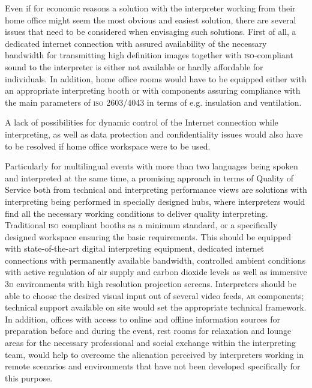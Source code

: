 \documentclass[output=paper]{langsci/langscibook}
\begin{document}
Even if for economic reasons a solution with the interpreter working from their home office might seem the most obvious and easiest solution, there are several issues that need to be considered when envisaging such solutions. First of all, a dedicated internet connection with assured availability of the necessary bandwidth for transmitting high definition images together with \textsc{iso}-compliant sound to the interpreter is either not available or hardly affordable for individuals. In addition, home office rooms would have to be equipped either with an appropriate interpreting booth or with components assuring compliance with the main parameters of \textsc{iso 2603/4043} in terms of e.g. insulation and ventilation.

A lack of possibilities for dynamic control of the Internet connection while interpreting, as well as data protection and confidentiality issues would also have to be resolved if home office workspace were to be used.

Particularly for multilingual events with more than two languages being spoken and interpreted at the same time, a promising approach in terms of Quality of Service both from technical and interpreting performance views are solutions with interpreting being performed in specially designed hubs, where interpreters would find all the necessary working conditions to deliver quality interpreting. Traditional \textsc{iso} compliant booths as a minimum standard, or a specifically designed workspace ensuring the basic requirements. This should be equipped with state-of-the-art digital interpreting equipment, dedicated internet connections with permanently available bandwidth, controlled ambient conditions with active regulation of air supply and carbon dioxide levels as well as immersive \textsc{3d} environments with high resolution projection screens. Interpreters should be able to choose the desired visual input out of several video feeds, \textsc{ar} components; technical support available on site would set the appropriate technical framework. In addition, offices with access to online and offline information sources for preparation before and during the event, rest rooms for relaxation and lounge areas for the necessary professional and social exchange within the interpreting team, would help to overcome the alienation perceived by interpreters working in remote scenarios and environments that have not been developed specifically for this purpose. 
\end{document}
